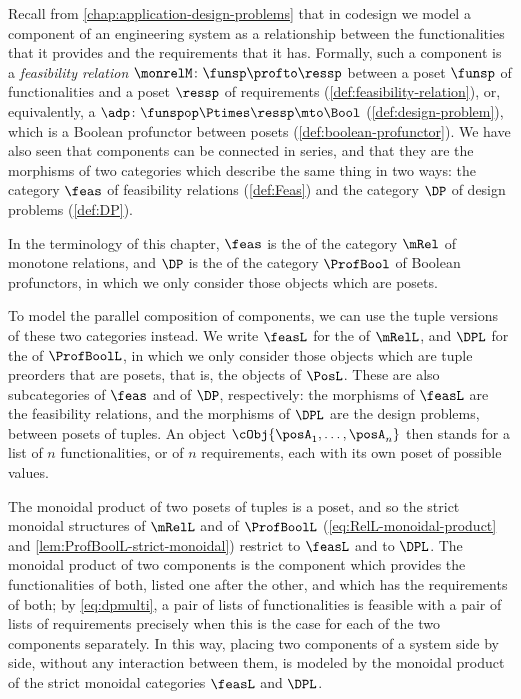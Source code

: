 \begin{example}[Codesign]
    \label{exa:codesign-strict-monoidal}
    Recall from \cref{chap:application-design-problems} that in codesign we model a component of an engineering system as a relationship between the functionalities that it provides and the requirements that it has.
    Formally, such a component is a \emph{feasibility relation} $\monrelM \colon \funsp \profto \ressp$ between a poset $\funsp$ of functionalities and a poset $\ressp$ of requirements (\cref{def:feasibility-relation}), or, equivalently, a  $\adp \colon \funspop \Ptimes \ressp \mto \Bool$ (\cref{def:design-problem}), which is a Boolean profunctor between posets (\cref{def:boolean-profunctor}).
    We have also seen that components can be connected in series, and that they are the morphisms of two categories which describe the same thing in two ways: the category $\feas$ of feasibility relations (\cref{def:Feas}) and the category $\DP$ of design problems (\cref{def:DP}).

    In the terminology of this chapter, $\feas$ is the  of the category $\mRel$ of monotone relations, and $\DP$ is the  of the category $\ProfBool$ of Boolean profunctors, in which we only consider those objects which are posets.

    To model the parallel composition of components, we can use the tuple versions of these two categories instead.
    \label{def:DPL}%
    We write $\feasL$ for the  of $\mRelL$, and $\DPL$ for the  of $\ProfBoolL$, in which we only consider those objects which are tuple preorders that are posets, that is, the objects of $\PosL$.
    These are also subcategories of $\feas$ and of $\DP$, respectively: the morphisms of $\feasL$ are the feasibility relations, and the morphisms of $\DPL$ are the design problems, between posets of tuples.
    An object $\cObj{\posA_1,\ldots, \posA_n}$ then stands for a list of $n$ functionalities, or of $n$ requirements, each with its own poset of possible values.

    The monoidal product of two posets of tuples is a poset, and so the strict monoidal structures of $\mRelL$ and of $\ProfBoolL$ (\cref{eq:RelL-monoidal-product} and \cref{lem:ProfBoolL-strict-monoidal}) restrict to $\feasL$ and to $\DPL$.
    The monoidal product of two components is the component which provides the functionalities of both, listed one after the other, and which has the requirements of both; by \cref{eq:dpmulti}, a pair of lists of functionalities is feasible with a pair of lists of requirements precisely when this is the case for each of the two components separately.
    In this way, placing two components of a system side by side, without any interaction between them, is modeled by the monoidal product of the strict monoidal categories $\feasL$ and $\DPL$.
\end{example}

